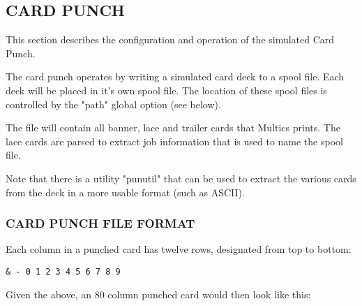 \subsection[Card Punch]{CARD PUNCH}

This section describes the configuration and operation of the simulated Card Punch.

The card punch operates by writing a simulated card deck to a spool file. Each deck
will be placed in it's own spool file. The location of these spool files is controlled
by the "path" global option (see below).

The file will contain all banner, lace and trailer cards that Multics prints. The lace
cards are parsed to extract job information that is used to name the spool file.

Note that there is a utility "punutil" that can be used to extract the various cards from 
the deck in a more usable format (such as ASCII).

\subsubsection[Card Punch File Format]{CARD PUNCH FILE FORMAT}

Each column in a punched card has twelve rows, designated from top to bottom:

\begin{adjustwidth}{5ex}{1ex}
    \texttt{\& - 0 1 2 3 4 5 6 7 8 9}
\end{adjustwidth}

Given the above, an 80 column punched card would then look like this:

